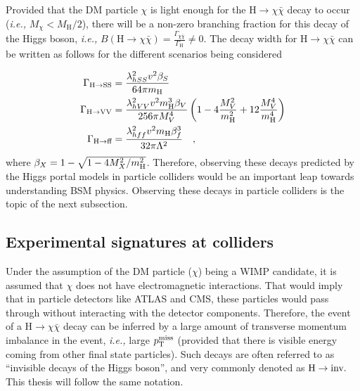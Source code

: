 Provided that the DM particle $\chi$ is light enough for the $\textrm{H} \rightarrow \chi \bar{\chi}$ decay to occur (\textit{i.e.,} $M_{\chi} < M_{\textrm{H}} / 2$), there will be a non-zero
branching fraction for this decay of the Higgs boson, \textit{i.e.,} $B(\textrm{H} \rightarrow \chi \bar{\chi}) = \frac{\Gamma_{\chi\bar{\chi}}}{\Gamma_{\textrm{H}}} \neq 0$. The decay width for
$\textrm{H} \rightarrow \chi \bar{\chi}$ can be written as follows for the different scenarios being considered~\cite{Djouadi:2011aa}

\begin{equation}
    \begin{split}
        \Gamma_{\textrm{H} \rightarrow \textrm{SS}} &= \frac{\lambda_{hSS}^{2} v^{2} \beta_{S}}{64 \pi m_{\textrm{H}}} \\
        \Gamma_{\textrm{H} \rightarrow \textrm{VV}} &= \frac{\lambda_{hVV}^{2} v^{2} m_{\textrm{H}}^{3} \beta_{V}}{256 \pi M_{V}^{4}} \left( 1 - 4 \frac{M_V^2}{m_{\textrm{H}}^2} + 12 \frac{M_V^4}{m_{\textrm{H}}^4} \right) \\
        \Gamma_{\textrm{H} \rightarrow \textrm{ff}} &= \frac{\lambda_{hff}^{2} v^{2} m_{\textrm{H}} \beta_{f}^{3}}{32 \pi \Lambda^{2}} \quad ,
    \end{split}
\end{equation}
where $\beta_{X} = 1 - \sqrt{1 - 4 M_X^2 / m_{\textrm{H}}^2}$. 
Therefore, observing these decays predicted by the Higgs portal models in particle colliders would be an important
leap towards understanding BSM physics. Observing these decays in particle colliders is the topic of the next subsection.

\subsection{Experimental signatures at colliders}
\label{subsec:exp_signatures}

Under the assumption of the DM particle ($\chi$) being a WIMP candidate, it is assumed that $\chi$ does not have electromagnetic interactions. That would imply
that in particle detectors like ATLAS and CMS, these particles would pass through without interacting with the detector components. Therefore, the event of a
$\textrm{H} \rightarrow \chi \bar{\chi}$ decay can be inferred by a large amount of transverse momentum imbalance in the event, \textit{i.e.,} large $p_{\textrm{T}}^{\textrm{miss}}$ (provided that there
is visible energy coming from other final state particles). Such decays are often referred to as ``invisible decays of the Higgs boson'', and very
commonly denoted as $\textrm{H} \rightarrow \textrm{inv.}$ This thesis will follow the same notation.

